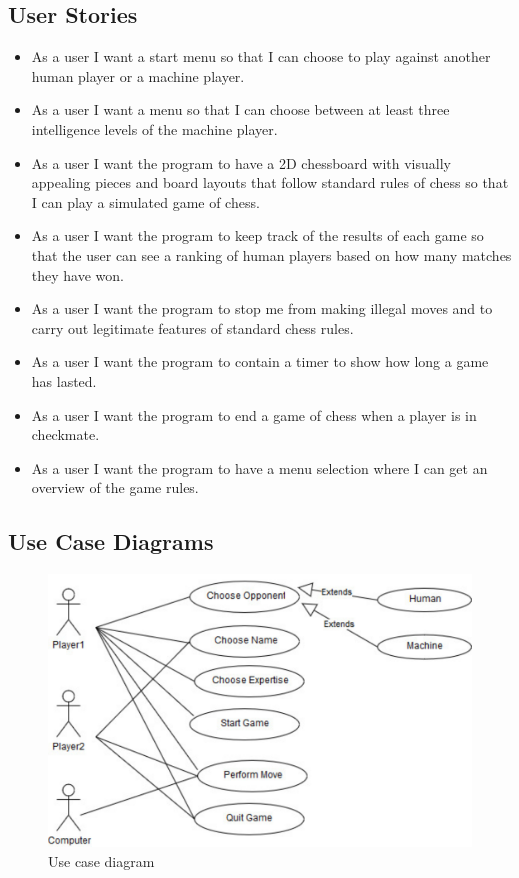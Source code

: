 \documentclass{article}
\begin{document}
\subsection{User Stories}
	\begin{itemize}
	\item As a user I want a start menu so that I can choose to play against another human player or a machine player.
	\item As a user I want a menu so that I can choose between at least three intelligence levels of the machine player.
	\item As a user I want the program to have a 2D chessboard with visually appealing pieces and board layouts that follow standard rules of chess so that I can play a simulated game of chess.
	\item As a user I want the program to keep track of the results of each game so that the user can see a ranking of human players based on how many matches they have won.

	\item As a user I want the program to stop me from making illegal moves and to carry out legitimate features of standard chess rules.
	\item As a user I want the program to contain a timer to show how long a game has lasted.
	\item As a user I want the program to end a game of chess when a player is in checkmate.
	\item As a user I want the program to have a menu selection where I can get an overview of the game rules.
	\end{itemize}

\newpage
\subsection{Use Case Diagrams}

\begin{figure}[h]
		\includegraphics*[scale=0.8]{User_case_diagram_1}
	\caption{Use case diagram }
	
\end{figure}
\end{document}
